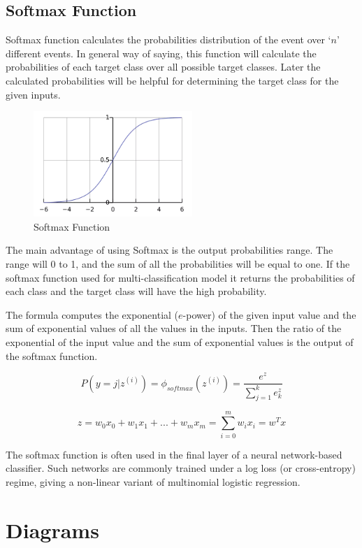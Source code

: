 \pagebreak

\subsection{Softmax Function}

Softmax function calculates the probabilities distribution of the event over ‘$n$’ different events. In general way of saying, this function will calculate the probabilities of each target class over all possible target classes. Later the calculated probabilities will be helpful for determining the target class for the given inputs.

\begin{figure}[H]
    \centering
    \includegraphics[width=6cm]{images/softmax-function.png}
    \caption{Softmax Function}
\end{figure}

The main advantage of using Softmax is the output probabilities range. The range will 0 to 1, and the sum of all the probabilities will be equal to one. If the softmax function used for multi-classification model it returns the probabilities of each class and the target class will have the high probability.

The formula computes the exponential ($e$-power) of the given input value and the sum of exponential values of all the values in the inputs. Then the ratio of the exponential of the input value and the sum of exponential values is the output of the softmax function.

\[
    P(y = j | z^{(i)}) = \phi_{softmax} (z^{(i)}) = \frac{e^z}{\sum_{j=1}^{k} e^z_k}
\]

\[
    z = w_0x_0 + w_1x_1 + ... + w_mx_m = \sum_{i=0}^{m} w_ix_i = w^Tx
\]

The softmax function is often used in the final layer of a neural network-based classifier. Such networks are commonly trained under a log loss (or cross-entropy) regime, giving a non-linear variant of multinomial logistic regression.

\pagebreak

\section{Diagrams}

